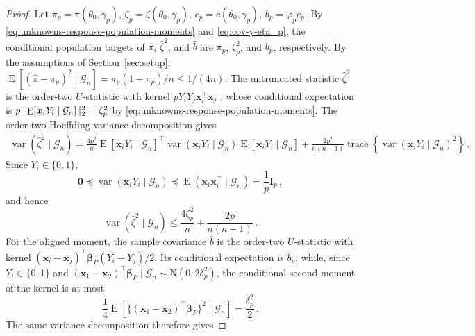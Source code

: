 \documentclass{article}
\makeatletter
\DeclareMathOperator{\expect}{E}
\DeclareMathOperator{\var}{var}
\DeclareMathOperator{\trace}{trace}
\theoremstyle{definition}
\newcommand{\vnorm}[1]{%
	\ensuremath{%
		\if@display
		\left\| #1 \right\|
		\else
		\| #1 \|
		\fi
	}%
}
\newcommand*{\bb}{\boldsymbol}
\def\bx{\bb{x}}
\def\bbeta{\bb{\beta}}
\makeatother
\begin{document}
\begin{bibunit}
\begin{proof}
Let
$
    \pi_p
    =
    \pi(\theta_0,\gamma_p)$, $
    \zeta_p
    =
    \zeta(\theta_0,\gamma_p)$, $
    c_p
    =
    c(\theta_0,\gamma_p)$, $
    b_p
    =
    \varphi_pc_p
$. 
By \eqref{eq:unknowns-response-population-moments} and
\eqref{eq:cov-y-eta_p}, the conditional population targets of
$\widehat\pi$, $\widehat\zeta^2$, and $\widehat b$ are
$\pi_p$, $\zeta_p^2$, and $b_p$, respectively.
By the assumptions of Section~\ref{sec:setup},
$
    \expect\left[
        (\widehat\pi-\pi_p)^2
        \mid
        \mathcal G_n
    \right]
    =
    \pi_p(1-\pi_p)/n
    \leq
    1/(4n)
$.
The untruncated statistic $\widehat\zeta^2$ is the order-two
$U$-statistic with kernel $pY_iY_j\bx_i^\top\bx_j$
\citep[Section~5.1]{serfling:1980}, whose conditional expectation is
$
    p\vnorm{\expect[\bx_iY_i\mid\mathcal G_n]}_2^2
    =
    \zeta_p^2
$
by \eqref{eq:unknowns-response-population-moments}.
The order-two Hoeffding variance decomposition
\citep[Section~5.2.1, Lemma~A]{serfling:1980}
gives
\begin{equation}
\label{eq:unknowns-response-u-variance-exact}
\begin{aligned}
    \var(\widehat\zeta^2\mid\mathcal G_n)
    =
    \frac{4p^2}{n}
    \expect[\bx_iY_i\mid\mathcal G_n]^\top
    \var(\bx_iY_i\mid\mathcal G_n)
    \expect[\bx_iY_i\mid\mathcal G_n]
    +
    \frac{2p^2}{n(n-1)}
    \trace\left\{
        \var(\bx_iY_i\mid\mathcal G_n)^2
    \right\}\,.
\end{aligned}
\end{equation}
Since $Y_i\in\{0,1\}$,
$$
    \bb0
    \preceq
    \var(\bx_iY_i\mid\mathcal G_n)
    \preceq
    \expect(\bx_i\bx_i^\top\mid\mathcal G_n)
    =
    \frac{1}{p}\bb I_p\,,
$$
and hence
\begin{equation}
\label{eq:unknowns-response-u-variance-bound}
    \var(\widehat\zeta^2\mid\mathcal G_n)
    \leq
    \frac{4\zeta_p^2}{n}
    +
    \frac{2p}{n(n-1)}\,.
\end{equation}
For the aligned moment, the sample covariance $\widehat b$ is the
order-two $U$-statistic with kernel
$
    (\bx_i-\bx_j)^\top\bbeta_P
    (Y_i-Y_j) /2
$.
Its conditional expectation is $b_p$, while, since $Y_i\in\{0,1\}$ and
$(\bx_1-\bx_2)^\top\bbeta_P\mid\mathcal G_n\sim\mathrm N(0,2\delta_p^2)$,
the conditional second moment of the kernel is at most
$$
    \frac{1}{4}
    \expect\left[
        \{(\bx_1-\bx_2)^\top\bbeta_P\}^2
        \mid
        \mathcal G_n
    \right]
    =
    \frac{\delta_p^2}{2}\,.
$$
The same variance decomposition therefore gives

\end{proof}
\end{bibunit}
\end{document}
